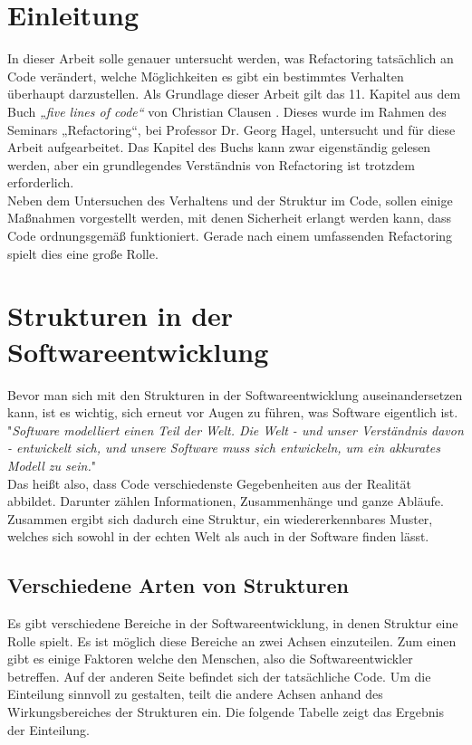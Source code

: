 \chapter{Einleitung}
In dieser Arbeit solle genauer untersucht werden, was Refactoring tatsächlich an Code verändert, welche Möglichkeiten es gibt ein bestimmtes Verhalten überhaupt darzustellen. Als Grundlage dieser Arbeit gilt das 11. Kapitel aus dem Buch \textit{„five lines of code“} von Christian Clausen \cite{fiveLines.2023}. Dieses wurde im Rahmen des Seminars „Refactoring“, bei Professor Dr. Georg Hagel, untersucht und für diese Arbeit aufgearbeitet. Das Kapitel des Buchs kann zwar eigenständig gelesen werden, aber ein grundlegendes Verständnis von Refactoring ist trotzdem erforderlich.\\
Neben dem Untersuchen des Verhaltens und der Struktur im Code, sollen einige Maßnahmen vorgestellt werden, mit denen Sicherheit erlangt werden kann, dass Code ordnungsgemäß funktioniert. Gerade nach einem umfassenden Refactoring spielt dies eine große Rolle. 
\chapter{Strukturen in der Softwareentwicklung}
Bevor man sich mit den Strukturen in der Softwareentwicklung auseinandersetzen kann, ist es wichtig, sich erneut vor Augen zu führen, was Software eigentlich ist.\\
"\emph{Software modelliert einen Teil der Welt. Die Welt - und unser Verständnis davon - entwickelt sich, und unsere Software muss sich entwickeln, um ein akkurates Modell zu sein.}" \cite{fiveLines.2023}\\
Das heißt also, dass Code verschiedenste Gegebenheiten aus der Realität abbildet. Darunter zählen Informationen, Zusammenhänge und ganze Abläufe. Zusammen ergibt sich dadurch eine Struktur, ein wiedererkennbares Muster, welches sich sowohl in der echten Welt als auch in der Software finden lässt. 
\section{Verschiedene Arten von Strukturen}

Es gibt verschiedene Bereiche in der Softwareentwicklung, in denen Struktur eine Rolle spielt. Es ist möglich diese Bereiche an zwei Achsen einzuteilen. Zum einen gibt es einige Faktoren welche den Menschen, also die Softwareentwickler betreffen. Auf der anderen Seite befindet sich der tatsächliche Code. Um die Einteilung sinnvoll zu gestalten, teilt die andere Achsen anhand des Wirkungsbereiches der Strukturen ein. \cite{fiveLines.2023}
Die folgende Tabelle zeigt das Ergebnis der Einteilung.


